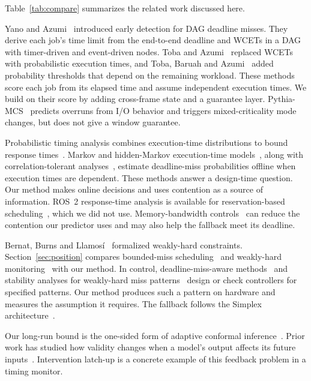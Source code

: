 \documentclass[acmsmall,screen]{acmart}
\begin{document}
Table~\ref{tab:compare} summarizes the related work discussed here.

Yano and Azumi~\cite{yano2023access} introduced early detection for DAG deadline misses. They derive each job's time limit from the end-to-end deadline and WCETs in a DAG with timer-driven and event-driven nodes. Toba and Azumi~\cite{toba2024} replaced WCETs with probabilistic execution times, and Toba, Baruah and Azumi~\cite{toba2026} added probability thresholds that depend on the remaining workload. These methods score each job from its elapsed time and assume independent execution times. We build on their score by adding cross-frame state and a guarantee layer. Pythia-MCS~\cite{jiang2020pythia} predicts overruns from I/O behavior and triggers mixed-criticality mode changes, but does not give a window guarantee.

Probabilistic timing analysis combines execution-time distributions to bound response times~\cite{bernat2002pwcet,davis2019survey}. Markov and hidden-Markov execution-time models~\cite{frias2017,friebe2023}, along with correlation-tolerant analyses~\cite{markovic2023cta,markovic2024caa}, estimate deadline-miss probabilities offline when execution times are dependent. These methods answer a design-time question. Our method makes online decisions and uses contention as a source of information. ROS~2 response-time analysis is available for reservation-based scheduling~\cite{casini2019ros2}, which we did not use. Memory-bandwidth controls~\cite{yun2013memguard} can reduce the contention our predictor uses and may also help the fallback meet its deadline.

Bernat, Burns and Llamos\'i~\cite{bernat2001weakly} formalized weakly-hard constraints. Section~\ref{sec:position} compares bounded-miss scheduling~\cite{bernat2001bms,hamdaoui1995} and weakly-hard monitoring~\cite{peeck2021,wu2020rv} with our method. In control, deadline-miss-aware methods~\cite{pazzaglia2019dmac} and stability analyses for weakly-hard miss patterns~\cite{maggio2020,vreman2021} design or check controllers for specified patterns. Our method produces such a pattern on hardware and measures the assumption it requires. The fallback follows the Simplex architecture~\cite{sha2001simplex}.

Our long-run bound is the one-sided form of adaptive conformal inference~\cite{gibbs2021}. Prior work has studied how validity changes when a model's output affects its future inputs~\cite{fannjiang2022}. Intervention latch-up is a concrete example of this feedback problem in a timing monitor.
\end{document}
